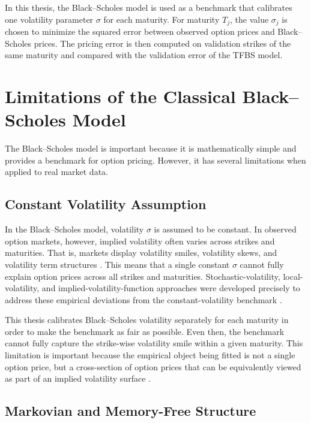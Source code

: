 \documentclass[11pt,a4paper]{report}
\begin{document}
In this thesis, the Black--Scholes model is used as a benchmark that calibrates one volatility parameter $\sigma$ for each maturity. For maturity $T_j$, the value $\sigma_j$ is chosen to minimize the squared error between observed option prices and Black--Scholes prices. The pricing error is then computed on validation strikes of the same maturity and compared with the validation error of the TFBS model.

\section{Limitations of the Classical Black--Scholes Model}

The Black--Scholes model is important because it is mathematically simple and provides a benchmark for option pricing. However, it has several limitations when applied to real market data.

\subsection{Constant Volatility Assumption}

In the Black--Scholes model, volatility $\sigma$ is assumed to be constant. In observed option markets, however, implied volatility often varies across strikes and maturities. That is, markets display volatility smiles, volatility skews, and volatility term structures \cite{Dupire1994,Heston1993,DumasFlemingWhaley1998,Gatheral2006}. This means that a single constant $\sigma$ cannot fully explain option prices across all strikes and maturities. Stochastic-volatility, local-volatility, and implied-volatility-function approaches were developed precisely to address these empirical deviations from the constant-volatility benchmark \cite{Heston1993,Dupire1994,DumasFlemingWhaley1998}.

This thesis calibrates Black--Scholes volatility separately for each maturity in order to make the benchmark as fair as possible. Even then, the benchmark cannot fully capture the strike-wise volatility smile within a given maturity. This limitation is important because the empirical object being fitted is not a single option price, but a cross-section of option prices that can be equivalently viewed as part of an implied volatility surface \cite{Gatheral2006}.

\subsection{Markovian and Memory-Free Structure}
\end{document}
